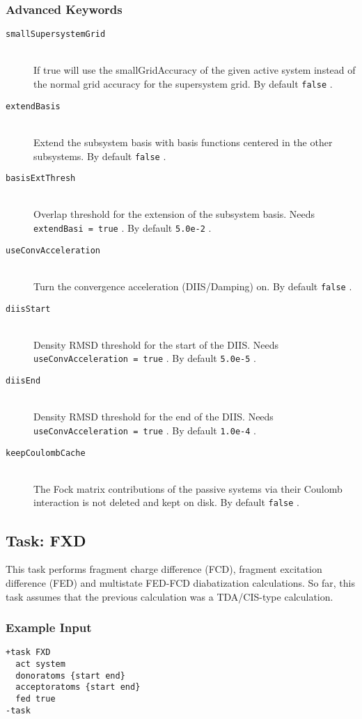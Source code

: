 \documentclass[bibliography=totocnumbered,a4paper,10pt,oneside]{scrbook}
\newcommand{\ttt}[1]{%
  \begingroup\setlength{\fboxsep}{1pt}%
  \colorbox{serenity-green!30}{\texttt{\hspace*{2pt}\vphantom{(g}#1\hspace*{2pt}}}%
  \endgroup
}
\begin{document}
\subsubsection{Advanced Keywords}
\begin{description}
	\item [\texttt{smallSupersystemGrid}]\hfill \\
	If true will use the smallGridAccuracy of the given active system instead of the normal grid accuracy for the supersystem grid. By default \ttt{false}.
	\item [\texttt{extendBasis}]\hfill \\
	Extend the subsystem basis with basis functions centered in the other subsystems. By default \ttt{false}.
	\item [\texttt{basisExtThresh}]\hfill \\
	Overlap threshold for the extension of the subsystem basis. Needs \ttt{extendBasi = true}. By default \ttt{5.0e-2}.
	\item [\texttt{useConvAcceleration}]\hfill \\
	Turn the convergence acceleration (DIIS/Damping) on. By default \ttt{false}.
	\item [\texttt{diisStart}]\hfill \\
	Density RMSD threshold for the start of the DIIS. Needs \ttt{useConvAcceleration = true}. By default \ttt{5.0e-5}.
	\item [\texttt{diisEnd}]\hfill \\
	Density RMSD threshold for the end of the DIIS. Needs \ttt{useConvAcceleration = true}. By default \ttt{1.0e-4}.
	\item [\texttt{keepCoulombCache}]\hfill \\
	The Fock matrix contributions of the passive systems via their Coulomb interaction is not deleted and kept on disk. By default \ttt{false}.
\end{description}
\subsection{Task: FXD}
\label{sec:FXD}
This task performs fragment charge difference (FCD), fragment excitation difference (FED) and multistate FED-FCD diabatization calculations.
So far, this task assumes that the previous calculation was a TDA/CIS-type calculation. 
\subsubsection{Example Input}
\begin{lstlisting}
+task FXD
  act system
  donoratoms {start end}
  acceptoratoms {start end}
  fed true
-task
\end{lstlisting}
\end{document}
